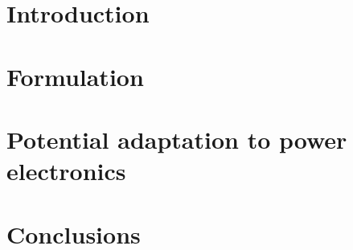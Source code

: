 \documentclass[10pt, a4paper]{report}
\begin{document}
\tableofcontents{}

\chapter{Introduction}


\chapter{Formulation}


\chapter{Potential adaptation to power electronics}


\chapter{Conclusions}


\printbibliography
\end{document}
